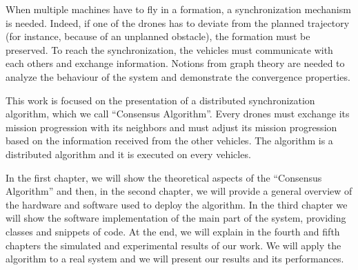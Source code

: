 When multiple machines have to fly in a formation, a synchronization mechanism is
needed. Indeed, if one of the drones has to deviate from the planned trajectory
(for instance, because of an unplanned obstacle), the formation must be preserved.
To reach the synchronization, the vehicles must communicate with each others and
exchange information.
Notions from graph theory are needed to analyze the behaviour of the system
and demonstrate the convergence properties.

This work is focused on the presentation of a distributed synchronization algorithm,
which we call “Consensus Algorithm”. Every drones must exchange its mission progression
with its neighbors and must adjust its mission progression based on the information
received from the other vehicles.
The algorithm is a distributed algorithm and it is executed on every vehicles.


In the first chapter, we will show the theoretical aspects of the “Consensus Algorithm” and then,
in the second chapter, we will provide a general overview of the hardware and software used to deploy the algorithm.
In the third chapter we will show the software implementation of the main part of the
system, providing classes and snippets of code.
At the end, we will explain in the fourth and fifth chapters the simulated and experimental results of
our work. We will apply the algorithm to a real system and we will present our results and its
performances.
